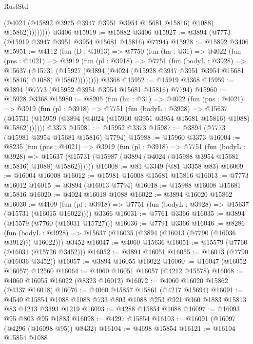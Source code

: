 \begin{lexlean}{RustStd}
\begin{coremodule}
                      (@4024 (@15892 @3975 @3947 @3951 @3954 @15681 @15816) @1088)
                      @15862)))))))))
    @3406
@15919 := @15882 @3406
@15927 := @3894 (@7773 (@15919 @3947 @3951 @3954 @15681 @15816) @7794)
@15928 := @15892 @3406
@15951 := @4112
    (fun (D : @1013) =>
    @7750
      (fun (hn : @31) =>
      @4022
        (fun (pns : @4021) =>
        @3919
          (fun (pl : @3918) =>
          @7751
            (fun (bodyL : @3928) =>
            @15637
              (@15731
                (@15927 (@3894 (@4024 (@15928 @3947 @3951 @3954 @15681 @15816) @1088) @15862))))))))
    @3368
@15952 := @15919 @3368
@15959 := @3894 (@7773 (@15952 @3951 @3954 @15681 @15816) @7794)
@15960 := @15928 @3368
@15980 := @8205
    (fun (hn : @31) =>
    @4022
      (fun (pns : @4021) =>
      @3919
        (fun (pl : @3918) =>
        @7751
          (fun (bodyL : @3928) =>
          @15637
            (@15731 (@15959 (@3894 (@4024 (@15960 @3951 @3954 @15681 @15816) @1088) @15862)))))))
    @3373
@15981 := @15952 @3373
@15987 := @3894 (@7773 (@15981 @3954 @15681 @15816) @7794)
@15988 := @15960 @3373
@16004 := @8235
    (fun (pns : @4021) =>
    @3919
      (fun (pl : @3918) =>
      @7751
        (fun (bodyL : @3928) =>
        @15637 (@15731 (@15987 (@3894 (@4024 (@15988 @3954 @15681 @15816) @1088) @15862))))))
@16008 := @81 @3349 (@81 @3358 @83)
@16009 := @16004 @16008
@16012 := @15981 @16008 @15681 @15816
@16013 := @7773 @16012
@16015 := @3894 (@16013 @7794)
@16018 := @15988 @16008 @15681 @15816
@16020 := @4024 @16018 @1088
@16022 := @3894 @16020 @15862
@16030 := @4109
    (fun (pl : @3918) => @7751 (fun (bodyL : @3928) => @15637 (@15731 (@16015 @16022))))
    @3366
@16031 := @7761 @3366
@16035 := @3894 (@15579 (@7760 (@16031 @15727)))
@16036 := @7791 @3366
@16046 := @8286
    (fun (bodyL : @3928) => @15637 (@16035 (@3894 (@16013 (@7790 (@16036 @3912))) @16022)))
    @3452
@16047 := @4060 @15636
@16051 := @15579 (@7760 (@16031 (@15726 @3452)))
@16052 := @3894 @16051
@16055 := @16013 (@7790 (@16036 @3452))
@16057 := @3894 @16055 @16022
@16060 := @16047 (@16052 @16057) @12560
@16064 := @4060 @16051 @16057 (@4212 @15578)
@16068 := @4060 @16055 @16022 (@8323 @16012)
@16072 := @4060 @16020 @15862 (@4337 @16018)
@16076 := @4060 @15857 @15861 (@4217 @15694)
@16091 := @4540 @15854 @1088 @1088 @733 @803 @1088 @253 @921 @360 @1883 @15813 @83 @1213 @3393 @1219
@16093 := @4288 @15854 @1088
@16097 := @16093 @95 @803 @95 @1883
@16098 := @4297 @15854
@16103 := @16091 (@16097 (@4296 (@16098 @95)) @8432)
@16104 := @4698 @15854
@16121 := @16104
    @15854
    @1088

\end{coremodule}
\end{lexlean}
